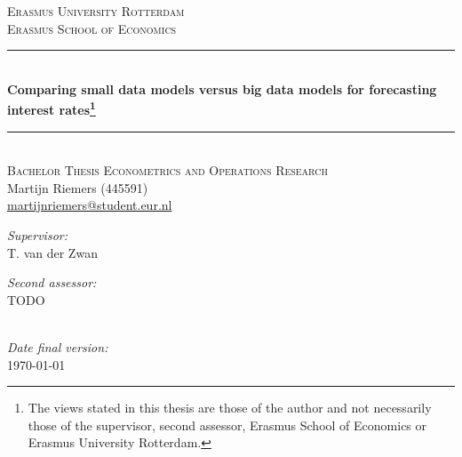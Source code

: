 \begin{titlepage}	
	\begin{center}
		\textsc{\Large{Erasmus University Rotterdam}} \\[.7cm]
		\textsc{Erasmus School of Economics} \\[0.5cm]
		
		\rule{\linewidth}{0.5mm} \\[0.4cm]
		\huge{\bfseries{Comparing small data models versus big data models for forecasting interest rates\footnote{The views stated in this thesis are those of the author and not necessarily those of the supervisor, second assessor, Erasmus School of Economics or Erasmus University Rotterdam.}}} \\
		\rule{\linewidth}{0.5mm} \\[.5cm]
		
		\textsc{\large{Bachelor Thesis Econometrics and Operations Research}} \\[.5cm]
		
		\large{Martijn Riemers (445591)} \\
		\large{\href{mailto:martijnriemers@student.eur.nl}{martijnriemers@student.eur.nl}} \\[.75cm]	
		
		\begin{minipage}[t]{0.4\textwidth}
		\center
		\large{\emph{Supervisor:}}\\
		\large{T. van der Zwan}
		\end{minipage}
		\begin{minipage}[t]{0.4\textwidth}
		\center
		\large{\emph{Second assessor:}} \\
		\large{TODO}
		\end{minipage}\\[.75cm]
		
		\large{\emph{Date final version:}} \\
		\large{\today} \\[4cm]
	\end{center}
\end{titlepage}